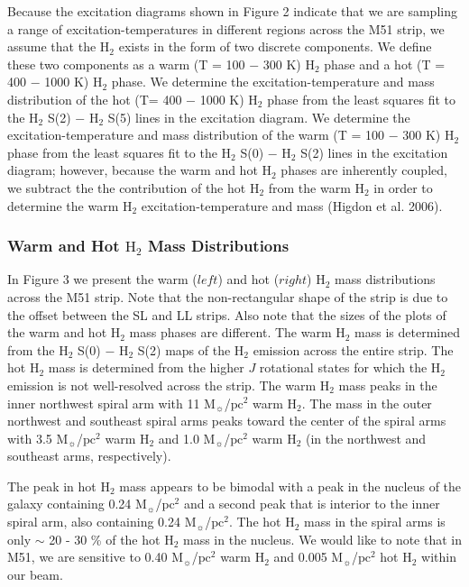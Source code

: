 \documentclass[manuscript]{aastex}
\begin{document}
Because the excitation diagrams shown in Figure 2 indicate that we are sampling a range of excitation-temperatures in different regions across the M51 strip, we assume that the $\mathrm{H_2}$ exists in the form of two discrete components.  We define these two components as a warm (T = 100 $-$ 300 K) $\mathrm{H_2}$ phase and a hot (T = 400 $-$ 1000 K) $\mathrm{H_2}$ phase.  We determine the excitation-temperature and mass distribution of the hot  (T= 400 $-$ 1000 K) $\mathrm{H_2}$ phase from the least squares fit to the $\mathrm{H_2}$ S(2) $-$ $\mathrm{H_2}$ S(5) lines in the excitation diagram.  We determine the excitation-temperature and mass distribution of the warm (T = 100 $-$ 300 K) $\mathrm{H_2}$ phase from the least squares fit to the $\mathrm{H_2}$ S(0) $-$ $\mathrm{H_2}$ S(2) lines in the excitation diagram; however, because the warm and hot $\mathrm{H_2}$ phases are inherently coupled, we subtract the the contribution of the hot $\mathrm{H_2}$ from the warm $\mathrm{H_2}$ in order to determine the warm $\mathrm{H_2}$ excitation-temperature and mass (Higdon et al. 2006).

\subsubsection{Warm and Hot $\mathrm{H_2}$ Mass Distributions}

In Figure 3 we present the warm ($left$) and hot ($right$) $\mathrm{H_2}$ mass distributions across the M51 strip.  Note that the non-rectangular shape of the strip is due to the offset between the SL and LL strips.  Also note that the sizes of the plots of the warm and hot $\mathrm{H_2}$ mass phases are different.  The warm $\mathrm{H_2}$ mass is determined from the $\mathrm{H_2}$ S(0) $-$ $\mathrm{H_2}$ S(2) maps of the $\mathrm{H_2}$ emission across the entire strip.  The hot $\mathrm{H_2}$ mass is determined from the higher $J$ rotational states for which the $\mathrm{H_2}$ emission is not well-resolved across the strip.  The warm $\mathrm{H_2}$ mass peaks in the inner northwest spiral arm with 11 $\mathrm{M_\sun}$/$\mathrm{pc^2}$ warm $\mathrm{H_2}$. The mass in the outer northwest and southeast spiral arms peaks toward the center of the spiral arms with 3.5 $\mathrm{M_\sun}$/$\mathrm{pc^2}$ warm $\mathrm{H_2}$ and 1.0 $\mathrm{M_\sun}$/$\mathrm{pc^2}$ warm $\mathrm{H_2}$ (in the northwest and southeast arms, respectively).

The peak in hot $\mathrm{H_2}$ mass appears to be bimodal with a peak in the nucleus of the galaxy containing 0.24 $\mathrm{M_\sun}$/$\mathrm{pc^2}$ and a second peak that is interior to the inner spiral arm, also containing 0.24 $\mathrm{M_\sun}$/$\mathrm{pc^2}$.  The hot $\mathrm{H_2}$ mass in the spiral arms is only $\sim$ 20 - 30 \% of the hot $\mathrm{H_2}$ mass in the nucleus.
We would like to note that in M51, 
we are sensitive to 
0.40 $\mathrm{M_\sun}$/$\mathrm{pc^2}$ warm $\mathrm{H_2}$ and 0.005 $\mathrm{M_\sun}$/$\mathrm{pc^2}$ hot $\mathrm{H_2}$ within our beam.
\end{document}

